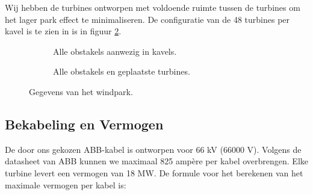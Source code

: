 Wij hebben de turbines ontworpen met voldoende ruimte tussen de turbines om het lager park effect te minimaliseren. De configuratie van de 48 turbines per kavel is te zien in is in figuur \ref{fig:windparkturbines}.
\begin{figure}[h]
    \centering
    \begin{subfigure}{0.5\textwidth}
        \centering
        \setlength{\fboxsep}{0pt}  %
    \colorbox{darkgray}{}
        \caption{Alle obstakels aanwezig in kavels.}
        \label{fig:windparkitems}
    \end{subfigure}%
    \begin{subfigure}{0.5\textwidth}
        \centering
        \setlength{\fboxsep}{0pt}  %
    \colorbox{darkgray}{}
        \caption{Alle obstakels en geplaatste turbines.}
        \label{fig:windparkturbines}
    \end{subfigure}
    \caption{Gegevens van het windpark.}
    \label{fig:windpark}
\end{figure}


\subsection{Bekabeling en Vermogen}
De door ons gekozen ABB-kabel is ontworpen voor 66 kV (66000 V). Volgens de datasheet van ABB kunnen we maximaal 825 ampère per kabel overbrengen. Elke turbine levert een vermogen van 18 MW. De formule voor het berekenen van het maximale vermogen per kabel is:

